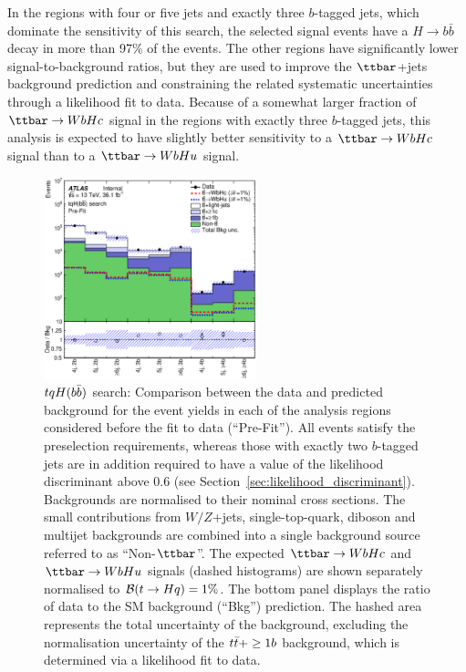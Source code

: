 In the regions with four or five jets and exactly three $b$-tagged jets, which dominate the sensitivity of this search, 
the selected signal events have a $H \to b\bar{b}$ decay in more than 97\% of the events.
The other regions have significantly lower signal-to-background ratios, but they are used to improve 
the $\ttbar$+jets background prediction and constraining the related systematic uncertainties
through a likelihood fit to data.  
Because of a somewhat larger fraction of $\Hc$ signal in the regions with exactly three $b$-tagged jets,
this analysis is expected to have slightly better sensitivity to a $\Hc$ signal than to a $\Hu$ signal.

\begin{figure}[t]
\begin{center}
\includegraphics[width=0.55\textwidth]{figures/Hbb/fit/cH_plots/Summary.eps}
\caption{$tqH(b\bar{b})$ search: Comparison between the data and predicted background for the event yields in each of the analysis regions considered 
before the fit to data (``Pre-Fit''). All events satisfy the preselection requirements, whereas those with exactly two $b$-tagged jets are
in addition required to have a value of the likelihood discriminant above 0.6 (see Section~\ref{sec:likelihood_discriminant}).
Backgrounds are normalised to their nominal cross sections.
The small contributions from $W/Z$+jets,  single-top-quark, diboson and multijet backgrounds are combined into a single background source 
referred to as ``Non-$\ttbar$''. 
The expected $\Hc$ and $\Hu$ signals (dashed histograms) are shown separately normalised to $\mathcal{B}(t\to Hq)=1\%$.
The bottom panel displays the ratio of data to the SM background (``Bkg'') prediction. 
The hashed area represents the total uncertainty of the background, excluding the normalisation uncertainty of the $t\bar{t}+\geq1b$ background, 
which is determined via a likelihood fit to data.} 
\label{fig:Hbb_Summary}
\end{center}
\end{figure}

